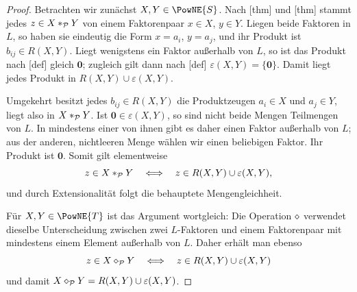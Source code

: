 \documentclass[main.tex]{subfiles}
\begin{document}
\begin{proof}
Betrachten wir zunächst \(X,Y\in\PowNE{S}\). Nach
[thm] und
[thm] stammt jedes
\(z\in X\mathbin{\ast}_{\mathcal P}Y\) von einem Faktorenpaar \(x\in X\),
\(y\in Y\). Liegen beide Faktoren in \(L\), so haben sie eindeutig die
Form \(x=a_i\), \(y=a_j\), und ihr Produkt ist \(b_{ij}\in R(X,Y)\).
Liegt wenigstens ein Faktor außerhalb von \(L\), so ist das Produkt nach
[def] gleich \(\mathbf0\); zugleich
gilt dann nach [def]
\(\varepsilon(X,Y)=\{\mathbf0\}\). Damit liegt jedes Produkt in
\(R(X,Y)\cup\varepsilon(X,Y)\).

Umgekehrt besitzt jedes \(b_{ij}\in R(X,Y)\) die Produktzeugen
\(a_i\in X\) und \(a_j\in Y\), liegt also in
\(X\mathbin{\ast}_{\mathcal P}Y\). Ist \(\mathbf0\in\varepsilon(X,Y)\), so
sind nicht beide Mengen Teilmengen von \(L\). In mindestens einer von ihnen
gibt es daher einen Faktor außerhalb von \(L\); aus der anderen,
nichtleeren Menge wählen wir einen beliebigen Faktor. Ihr Produkt ist
\(\mathbf0\). Somit gilt elementweise
\[
  z\in X\mathbin{\ast}_{\mathcal P}Y
  \quad\Longleftrightarrow\quad
  z\in R(X,Y)\cup\varepsilon(X,Y),
\]
und durch Extensionalität folgt die behauptete Mengengleichheit.

Für \(X,Y\in\PowNE{T}\) ist das Argument wortgleich: Die Operation
\(\mathbin{\diamond}\) verwendet dieselbe Unterscheidung zwischen zwei
\(L\)-Faktoren und einem Faktorenpaar mit mindestens einem Element außerhalb
von \(L\). Daher erhält man ebenso
\[
  z\in X\mathbin{\diamond}_{\mathcal P}Y
  \quad\Longleftrightarrow\quad
  z\in R(X,Y)\cup\varepsilon(X,Y)
\]
und damit
\(X\mathbin{\diamond}_{\mathcal P}Y=R(X,Y)\cup\varepsilon(X,Y)\).
\end{proof}
\end{document}
